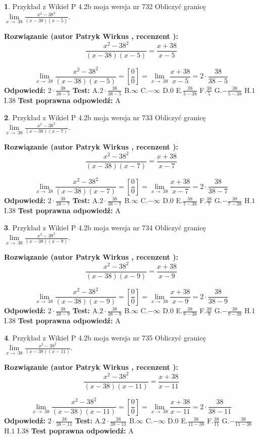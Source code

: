 \documentclass[12pt, a4paper]{article}
\theoremstyle{definition} %
\newtheorem{zad}{}
\newcommand{\zadStart}[1]{\begin{zad}#1\newline}
\newcommand{\zadStop}{\end{zad}}
\newcommand{\rozwStart}[2]{\noindent \textbf{Rozwiązanie (autor #1 , recenzent #2): }\newline}
\newcommand{\rozwStop}{\newline}
\newcommand{\odpStart}{\noindent \textbf{Odpowiedź:}\newline}
\newcommand{\odpStop}{\newline}
\newcommand{\testStart}{\noindent \textbf{Test:}\newline}
\newcommand{\testStop}{\newline}
\newcommand{\kluczStart}{\noindent \textbf{Test poprawna odpowiedź:}\newline}
\newcommand{\kluczStop}{\newline}
\begin{document}
\zadStart{Przykład z Wikieł P 4.2b moja wersja nr 732}
Obliczyć granicę $\lim\limits_{x\to\ 38}\frac{x^{2}-38^{2}}{(x-38)(x-5)}$.
\zadStop
\rozwStart{Patryk Wirkus}{}
$$\frac{x^{2}-38^{2}}{(x-38)(x-5)}=\frac{x+38}{x-5}$$

$$\lim\limits_{x\to\ 38}\frac{x^{2}-38^{2}}{(x-38)(x-5)}=[\frac{0}{0}]=\lim\limits_{x\to\ 38}\frac{x+38}{x-5}=2 \cdot \frac{38}{38-5}$$
\rozwStop
\odpStart
$2 \cdot \frac{38}{38-5}$
\odpStop
\testStart
A.$2 \cdot \frac{38}{38-5}$
B.$\infty$
C.$-\infty$
D.$0$
E.$\frac{38}{5-38}$
F.$\frac{38}{5}$
G.$-\frac{38}{5-38}$
H.$1$
I.$38$
\testStop
\kluczStart
A
\kluczStop



\zadStart{Przykład z Wikieł P 4.2b moja wersja nr 733}
Obliczyć granicę $\lim\limits_{x\to\ 38}\frac{x^{2}-38^{2}}{(x-38)(x-7)}$.
\zadStop
\rozwStart{Patryk Wirkus}{}
$$\frac{x^{2}-38^{2}}{(x-38)(x-7)}=\frac{x+38}{x-7}$$

$$\lim\limits_{x\to\ 38}\frac{x^{2}-38^{2}}{(x-38)(x-7)}=[\frac{0}{0}]=\lim\limits_{x\to\ 38}\frac{x+38}{x-7}=2 \cdot \frac{38}{38-7}$$
\rozwStop
\odpStart
$2 \cdot \frac{38}{38-7}$
\odpStop
\testStart
A.$2 \cdot \frac{38}{38-7}$
B.$\infty$
C.$-\infty$
D.$0$
E.$\frac{38}{7-38}$
F.$\frac{38}{7}$
G.$-\frac{38}{7-38}$
H.$1$
I.$38$
\testStop
\kluczStart
A
\kluczStop



\zadStart{Przykład z Wikieł P 4.2b moja wersja nr 734}
Obliczyć granicę $\lim\limits_{x\to\ 38}\frac{x^{2}-38^{2}}{(x-38)(x-9)}$.
\zadStop
\rozwStart{Patryk Wirkus}{}
$$\frac{x^{2}-38^{2}}{(x-38)(x-9)}=\frac{x+38}{x-9}$$

$$\lim\limits_{x\to\ 38}\frac{x^{2}-38^{2}}{(x-38)(x-9)}=[\frac{0}{0}]=\lim\limits_{x\to\ 38}\frac{x+38}{x-9}=2 \cdot \frac{38}{38-9}$$
\rozwStop
\odpStart
$2 \cdot \frac{38}{38-9}$
\odpStop
\testStart
A.$2 \cdot \frac{38}{38-9}$
B.$\infty$
C.$-\infty$
D.$0$
E.$\frac{38}{9-38}$
F.$\frac{38}{9}$
G.$-\frac{38}{9-38}$
H.$1$
I.$38$
\testStop
\kluczStart
A
\kluczStop



\zadStart{Przykład z Wikieł P 4.2b moja wersja nr 735}
Obliczyć granicę $\lim\limits_{x\to\ 38}\frac{x^{2}-38^{2}}{(x-38)(x-11)}$.
\zadStop
\rozwStart{Patryk Wirkus}{}
$$\frac{x^{2}-38^{2}}{(x-38)(x-11)}=\frac{x+38}{x-11}$$

$$\lim\limits_{x\to\ 38}\frac{x^{2}-38^{2}}{(x-38)(x-11)}=[\frac{0}{0}]=\lim\limits_{x\to\ 38}\frac{x+38}{x-11}=2 \cdot \frac{38}{38-11}$$
\rozwStop
\odpStart
$2 \cdot \frac{38}{38-11}$
\odpStop
\testStart
A.$2 \cdot \frac{38}{38-11}$
B.$\infty$
C.$-\infty$
D.$0$
E.$\frac{38}{11-38}$
F.$\frac{38}{11}$
G.$-\frac{38}{11-38}$
H.$1$
I.$38$
\testStop
\kluczStart
A
\kluczStop
\end{document}
